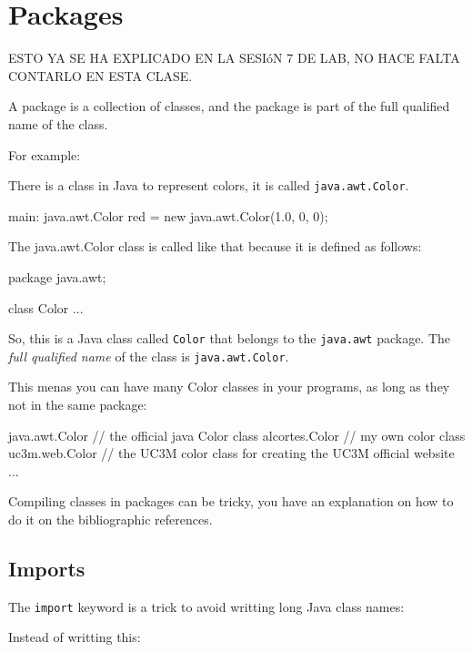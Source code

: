 \documentclass[a4paper, 9pt]{extarticle}
\begin{document}
\section{Packages}

ESTO YA SE HA EXPLICADO EN LA SESIóN 7 DE LAB, NO HACE FALTA CONTARLO EN ESTA CLASE.

A package is a collection of classes, and the package is part of the full
qualified name of the class.

For example:

There is a class in Java to represent colors, it is called
\texttt{java.awt.Color}.

\begin{blackboard}
  main:
    java.awt.Color red = new java.awt.Color(1.0, 0, 0);
\end{blackboard}

The java.awt.Color class is called like that because it is defined as follows:

\begin{blackboard}
package java.awt;

class Color {
...
}
\end{blackboard}

So, this is a Java class called \texttt{Color} that belongs to the
\texttt{java.awt} package. The \textsl{full qualified name} of the class is
\texttt{java.awt.Color}.

This menas you can have many Color classes in your programs, as long as they
not in the same package:

\begin{blackboard}
java.awt.Color // the official java Color class
alcortes.Color // my own color class
uc3m.web.Color // the UC3M color class for creating the UC3M official website
...
\end{blackboard}

Compiling classes in packages can be tricky, you have an explanation on how to
do it on the bibliographic references.





\subsection{Imports}

The \texttt{import} keyword is a trick to avoid writting long Java class names:

Instead of writting this:

\end{document}
